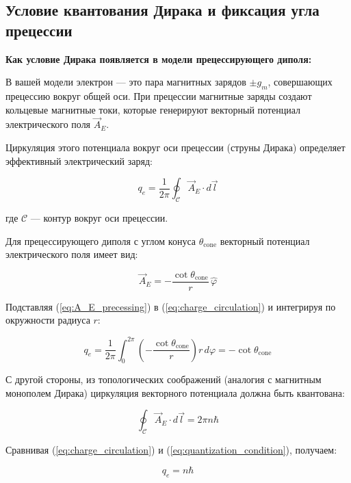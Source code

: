\documentclass[12pt]{article}
\begin{document}
\subsection{Условие квантования Дирака и фиксация угла прецессии}

\textbf{Как условие Дирака появляется в модели прецессирующего диполя:}

В вашей модели электрон — это пара магнитных зарядов $\pm g_m$, совершающих прецессию вокруг общей оси. При прецессии магнитные заряды создают кольцевые магнитные токи, которые генерируют векторный потенциал электрического поля $\vec{A}_E$.

Циркуляция этого потенциала вокруг оси прецессии (струны Дирака) определяет эффективный электрический заряд:

\begin{equation}
q_e = \frac{1}{2\pi} \oint_{\mathcal{C}} \vec{A}_E \cdot d\vec{l}
\label{eq:charge_circulation}
\end{equation}

где $\mathcal{C}$ — контур вокруг оси прецессии.

Для прецессирующего диполя с углом конуса $\theta_{\text{cone}}$ векторный потенциал электрического поля имеет вид:

\begin{equation}
\vec{A}_E = -\frac{\cot\theta_{\text{cone}}}{r} \, \hat{\varphi}
\label{eq:A_E_precessing}
\end{equation}

Подставляя (\ref{eq:A_E_precessing}) в (\ref{eq:charge_circulation}) и интегрируя по окружности радиуса $r$:

\begin{equation}
q_e = \frac{1}{2\pi} \int_0^{2\pi} \left(-\frac{\cot\theta_{\text{cone}}}{r}\right) r \, d\varphi = -\cot\theta_{\text{cone}}
\label{eq:q_e_theta}
\end{equation}

С другой стороны, из топологических соображений (аналогия с магнитным монополем Дирака) циркуляция векторного потенциала должна быть квантована:

\begin{equation}
\oint_{\mathcal{C}} \vec{A}_E \cdot d\vec{l} = 2\pi n \hbar
\label{eq:quantization_condition}
\end{equation}

Сравнивая (\ref{eq:charge_circulation}) и (\ref{eq:quantization_condition}), получаем:

\begin{equation}
q_e = n \hbar
\label{eq:q_e_quantized}
\end{equation}
\end{document}
